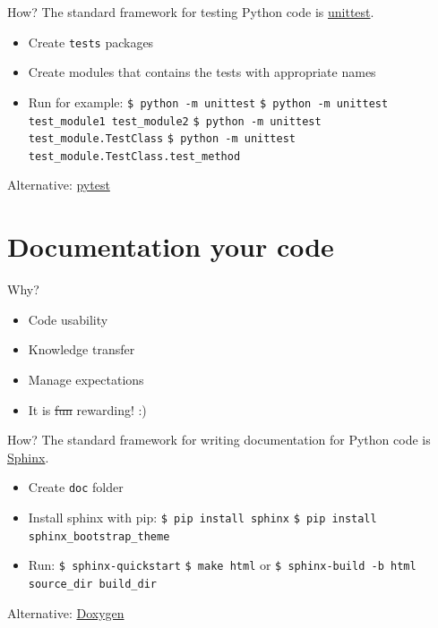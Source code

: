 \documentclass[compress,english,aspectratio=1610]{beamer}
\let\olditem\item
\renewcommand{\item}{\setlength{\itemsep}{\fill}\olditem}
\begin{document}
\begin{frame}{How?}
    The standard framework for testing Python code is
    \href{https://docs.python.org/3/library/unittest.html}{unittest}.
    \begin{itemize}
        \item Create {\tt tests} packages
        \item Create modules that contains the tests with appropriate names
        \item Run for example: \newline
        {\tt \$ python -m unittest} \newline
        {\tt \$ python -m unittest test\_module1 test\_module2} \newline
        {\tt \$ python -m unittest test\_module.TestClass} \newline
        {\tt \$ python -m unittest test\_module.TestClass.test\_method} \newline
    \end{itemize}

    Alternative: \href{https://docs.pytest.org/en/stable/}{pytest}
\end{frame}

\section{Documentation your code}
\begin{frame}{Why?}
    \begin{itemize}
        \item Code usability
        \item Knowledge transfer
        \item Manage expectations
        \item It is \sout{fun} rewarding! :)
    \end{itemize}
\end{frame}

\begin{frame}{How?}
	The standard framework for writing documentation for Python code is
    \href{https://www.sphinx-doc.org/en/master/}{Sphinx}.
    \begin{itemize}
        \item Create {\tt doc} folder
        \item Install sphinx with pip: \newline
        {\tt \$ pip install sphinx} \newline
        {\tt \$ pip install sphinx\_bootstrap\_theme} \newline

        \item Run: \newline
        {\tt \$ sphinx-quickstart} \newline
        {\tt \$ make html} \newline
        or \newline
        {\tt \$ sphinx-build -b html source\_dir build\_dir} \newline
    \end{itemize}
    Alternative: \href{https://www.doxygen.nl/index.html}{Doxygen}
\end{frame}
\end{document}
